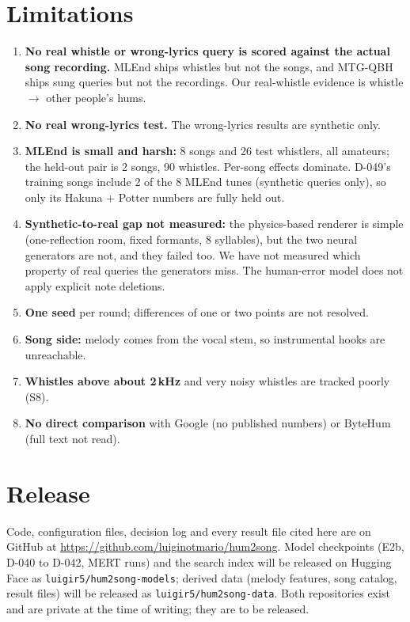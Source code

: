 \documentclass[11pt]{article}
\begin{document}
\section{Limitations}\label{sec:limits}
\begin{enumerate}
\item \textbf{No real whistle or wrong-lyrics query is scored against the actual song recording.} MLEnd ships whistles but not the songs, and MTG-QBH ships sung queries but not the recordings. Our real-whistle evidence is whistle $\to$ other people's hums.
\item \textbf{No real wrong-lyrics test.} The wrong-lyrics results are synthetic only.
\item \textbf{MLEnd is small and harsh:} 8 songs and 26 test whistlers, all amateurs; the held-out pair is 2 songs, 90 whistles. Per-song effects dominate. D-049's training songs include 2 of the 8 MLEnd tunes (synthetic queries only), so only its Hakuna + Potter numbers are fully held out.
\item \textbf{Synthetic-to-real gap not measured:} the physics-based renderer is simple (one-reflection room, fixed formants, 8 syllables), but the two neural generators are not, and they failed too. We have not measured which property of real queries the generators miss. The human-error model does not apply explicit note deletions.
\item \textbf{One seed} per round; differences of one or two points are not resolved.
\item \textbf{Song side:} melody comes from the vocal stem, so instrumental hooks are unreachable.
\item \textbf{Whistles above about 2\,kHz} and very noisy whistles are tracked poorly (S8).
\item \textbf{No direct comparison} with Google (no published numbers) or ByteHum (full text not read).
\end{enumerate}

\section{Release}\label{sec:release}
Code, configuration files, decision log and every result file cited here are on GitHub at \url{https://github.com/luiginotmario/hum2song}. Model checkpoints (E2b, D-040 to D-042, MERT runs) and the search index will be released on Hugging Face as \texttt{luigir5/hum2song-models}; derived data (melody features, song catalog, result files) will be released as \texttt{luigir5/hum2song-data}. Both repositories exist and are private at the time of writing; they are to be released.
\end{document}
